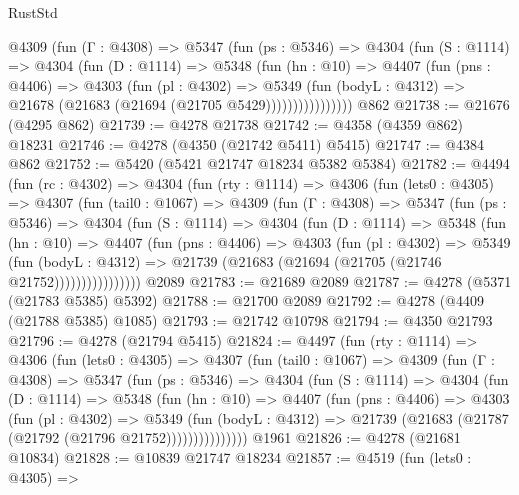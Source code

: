 \begin{lexlean}{RustStd}
\begin{coremodule}
{\begin{coremodule}
{{{{{{{{{{{{{{{{{{{{{{{{{{{{{{{{{{{            @4309
              (fun (Γ : @4308) =>
              @5347
                (fun (ps : @5346) =>
                @4304
                  (fun (S : @1114) =>
                  @4304
                    (fun (D : @1114) =>
                    @5348
                      (fun (hn : @10) =>
                      @4407
                        (fun (pns : @4406) =>
                        @4303
                          (fun (pl : @4302) =>
                          @5349
                            (fun (bodyL : @4312) =>
                            @21678 (@21683 (@21694 (@21705 @5429))))))))))))))))
    @862
@21738 := @21676 (@4295 @862)
@21739 := @4278 @21738
@21742 := @4358 (@4359 @862) @18231
@21746 := @4278 (@4350 (@21742 @5411) @5415)
@21747 := @4384 @862
@21752 := @5420 (@5421 @21747 @18234 @5382 @5384)
@21782 := @4494
    (fun (rc : @4302) =>
    @4304
      (fun (rty : @1114) =>
      @4306
        (fun (lets0 : @4305) =>
        @4307
          (fun (tail0 : @1067) =>
          @4309
            (fun (Γ : @4308) =>
            @5347
              (fun (ps : @5346) =>
              @4304
                (fun (S : @1114) =>
                @4304
                  (fun (D : @1114) =>
                  @5348
                    (fun (hn : @10) =>
                    @4407
                      (fun (pns : @4406) =>
                      @4303
                        (fun (pl : @4302) =>
                        @5349
                          (fun (bodyL : @4312) =>
                          @21739 (@21683 (@21694 (@21705 (@21746 @21752))))))))))))))))
    @2089
@21783 := @21689 @2089
@21787 := @4278 (@5371 (@21783 @5385) @5392)
@21788 := @21700 @2089
@21792 := @4278 (@4409 (@21788 @5385) @1085)
@21793 := @21742 @10798
@21794 := @4350 @21793
@21796 := @4278 (@21794 @5415)
@21824 := @4497
    (fun (rty : @1114) =>
    @4306
      (fun (lets0 : @4305) =>
      @4307
        (fun (tail0 : @1067) =>
        @4309
          (fun (Γ : @4308) =>
          @5347
            (fun (ps : @5346) =>
            @4304
              (fun (S : @1114) =>
              @4304
                (fun (D : @1114) =>
                @5348
                  (fun (hn : @10) =>
                  @4407
                    (fun (pns : @4406) =>
                    @4303
                      (fun (pl : @4302) =>
                      @5349
                        (fun (bodyL : @4312) =>
                        @21739 (@21683 (@21787 (@21792 (@21796 @21752)))))))))))))))
    @1961
@21826 := @4278 (@21681 @10834)
@21828 := @10839 @21747 @18234
@21857 := @4519
    (fun (lets0 : @4305) =>
}}}}}}}}}}}}}}}}}}}}}}}}}}}}}}}}}}}
\end{coremodule}}
\end{coremodule}
\end{lexlean}
